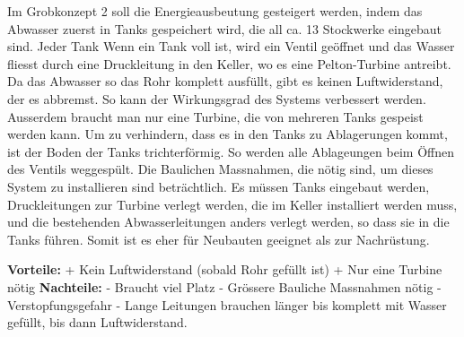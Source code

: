 Im Grobkonzept 2 soll die Energieausbeutung gesteigert werden, indem das Abwasser zuerst in Tanks gespeichert wird, die all ca. 13 Stockwerke eingebaut sind. Jeder Tank Wenn ein Tank voll ist, wird ein Ventil geöffnet und das Wasser fliesst durch eine Druckleitung in den Keller, wo es eine Pelton-Turbine antreibt. Da das Abwasser so das Rohr komplett ausfüllt, gibt es keinen Luftwiderstand, der es abbremst. So kann der Wirkungsgrad des Systems verbessert werden. Ausserdem braucht man nur eine Turbine, die von mehreren Tanks gespeist werden kann. Um zu verhindern, dass es in den Tanks zu Ablagerungen kommt, ist der Boden der Tanks trichterförmig. So werden alle Ablageungen beim Öffnen des Ventils weggespült. 
Die Baulichen Massnahmen, die nötig sind, um dieses System zu installieren sind beträchtlich. Es müssen Tanks eingebaut werden, Druckleitungen zur Turbine verlegt werden, die im Keller installiert werden muss, und die bestehenden Abwasserleitungen anders verlegt werden, so dass sie in die Tanks führen. Somit ist es eher für Neubauten geeignet als zur Nachrüstung.

\textbf{Vorteile:} 									\newline
+	Kein Luftwiderstand (sobald Rohr gefüllt ist)	\newline
+	Nur eine Turbine nötig							\newline
\textbf{Nachteile:}									\newline
-	Braucht viel Platz 								\newline
-	Grössere Bauliche Massnahmen nötig				\newline
-	Verstopfungsgefahr 								\newline
-	Lange Leitungen brauchen länger bis komplett mit Wasser gefüllt, bis dann Luftwiderstand.
